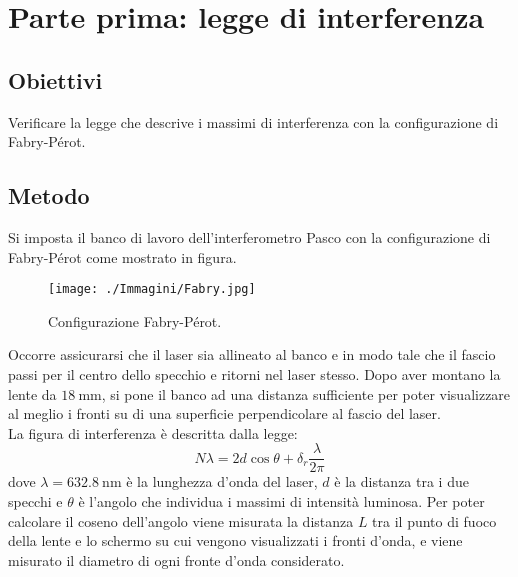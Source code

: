 \documentclass[a4paper]{article}
\begin{document}
\section{Parte prima: legge di interferenza}
\subsection{Obiettivi}
Verificare la legge che descrive i massimi di interferenza con la configurazione di Fabry-Pérot. 

\subsection{Metodo}
Si imposta il banco di lavoro dell'interferometro Pasco con la configurazione di Fabry-Pérot come mostrato in figura.
\begin{figure}[h]
    \centering
    \texttt{[image: ./Immagini/Fabry.jpg]}
    \caption[Configurazione Fabry-Pérot]{Configurazione Fabry-Pérot.}
    \label{fig:1}
\end{figure}
Occorre assicurarsi che il laser sia allineato al banco e in modo tale che il fascio passi per il centro dello specchio e ritorni nel laser stesso. Dopo aver montano la lente da $\SI{18}{\mm}$, si pone il banco ad una distanza sufficiente per poter visualizzare al meglio i fronti su di una superficie perpendicolare al fascio del laser.\\
La figura di interferenza è descritta dalla legge:
\[
N\lambda = 2d\cos\theta + \delta_r\frac{\lambda}{2\pi}
\]
dove $\lambda=\SI{632.8}{\nm}$ è la lunghezza d'onda del laser, $d$ è la distanza tra i due specchi e $\theta$ è l'angolo che individua i massimi di intensità luminosa. Per poter calcolare il coseno dell'angolo viene misurata la distanza $L$ tra il punto di fuoco della lente e lo schermo su cui vengono visualizzati i fronti d'onda, e viene misurato il diametro di ogni fronte d'onda considerato.
\end{document}
